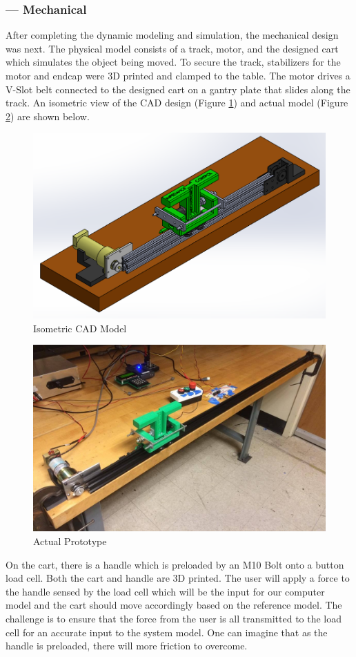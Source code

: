 \subsubsection*{ --- Mechanical} 
After completing the dynamic modeling and simulation, the mechanical design was next. The physical model consists of a track, motor, and the designed cart which simulates the object being moved. To secure the track, stabilizers for the motor and endcap were 3D printed and clamped to the table. The motor drives a V-Slot belt connected to the designed cart on a gantry plate that slides along the track. An isometric view of the CAD design (Figure \ref{fig:Isometric_Full_View}) and actual model (Figure \ref{fig:Iso_Real_Full}) are shown below.

\begin{figure}[h]
	\centering
	\includegraphics[width=0.85\columnwidth]{Images/Isometric_Full_View}
	\caption{Isometric CAD Model}
	\label{fig:Isometric_Full_View}
\end{figure}
\begin{figure}[h]
	\begin{center}
		\includegraphics[width=0.85\columnwidth]{Images/Iso_Real_Full}
		\caption{Actual Prototype}
		\label{fig:Iso_Real_Full}
	\end{center}
\end{figure}
On the cart, there is a handle which is preloaded by an M10 Bolt onto a button load cell. Both the cart and handle are 3D printed. The user will apply a force to the handle sensed by the load cell which will be the input for our computer model and the cart should move accordingly based on the reference model. The challenge is to ensure that the force from the user is all transmitted to the load cell for an accurate input to the system model. One can imagine that as the handle is preloaded, there will more friction to overcome.

